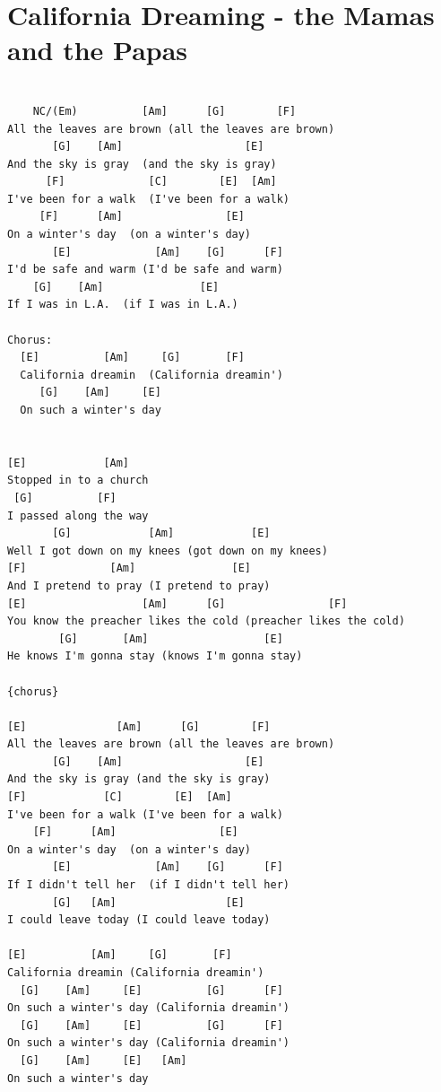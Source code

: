 \documentclass[
]{book}
\let\stdsection\section
\renewcommand\section{\clearpage\stdsection}
\begin{document}
\hypertarget{classics-calafornia-dreaming}{%
\section{California Dreaming - the Mamas and the Papas}\label{classics-calafornia-dreaming}}

\begin{verbatim}

    NC/(Em)          [Am]      [G]        [F]
All the leaves are brown (all the leaves are brown)
       [G]    [Am]                   [E]
And the sky is gray  (and the sky is gray)
      [F]             [C]        [E]  [Am]
I've been for a walk  (I've been for a walk)
     [F]      [Am]                [E]
On a winter's day  (on a winter's day)
       [E]             [Am]    [G]      [F]
I'd be safe and warm (I'd be safe and warm)
    [G]    [Am]               [E]
If I was in L.A.  (if I was in L.A.)

Chorus:
  [E]          [Am]     [G]       [F]
  California dreamin  (California dreamin')
     [G]    [Am]     [E]
  On such a winter's day


[E]            [Am]
Stopped in to a church
 [G]          [F]
I passed along the way
       [G]            [Am]            [E]
Well I got down on my knees (got down on my knees)
[F]             [Am]               [E]
And I pretend to pray (I pretend to pray)
[E]                  [Am]      [G]                [F]
You know the preacher likes the cold (preacher likes the cold)
        [G]       [Am]                  [E]
He knows I'm gonna stay (knows I'm gonna stay)

{chorus}

[E]              [Am]      [G]        [F]
All the leaves are brown (all the leaves are brown)
       [G]    [Am]                   [E]
And the sky is gray (and the sky is gray)
[F]            [C]        [E]  [Am]
I've been for a walk (I've been for a walk)
    [F]      [Am]                [E]
On a winter's day  (on a winter's day)
       [E]             [Am]    [G]      [F]
If I didn't tell her  (if I didn't tell her)
       [G]   [Am]                 [E]
I could leave today (I could leave today)

[E]          [Am]     [G]       [F]
California dreamin (California dreamin')
  [G]    [Am]     [E]          [G]      [F]
On such a winter's day (California dreamin')
  [G]    [Am]     [E]          [G]      [F]
On such a winter's day (California dreamin')
  [G]    [Am]     [E]   [Am]
On such a winter's day
\end{verbatim}
\end{document}
